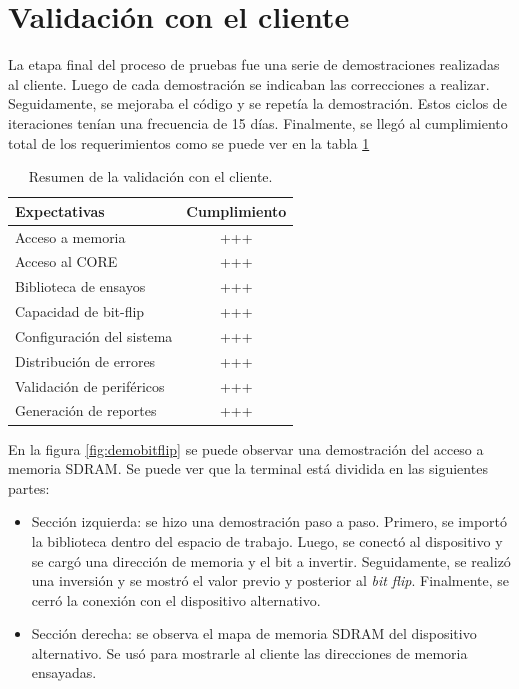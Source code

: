 \section{Validación con el cliente}
\label{sec:validacion}

La etapa final del proceso de pruebas fue una serie de demostraciones realizadas al cliente.
Luego de cada demostración se indicaban las correcciones a realizar.
Seguidamente, se mejoraba el código y se repetía la demostración.
Estos ciclos de iteraciones tenían una frecuencia de 15 días.
Finalmente, se llegó al cumplimiento total de los requerimientos como se puede ver en la tabla \ref{tab:validacion}

\begin{table}[h]
	\centering
	\caption[Resumen de la validación con el cliente]{Resumen de la validación con el cliente.}

	\begin{tabular}{l c}    
		\toprule
        \textbf{Expectativas}     & \textbf{Cumplimiento} \\
		\midrule
		Acceso a memoria          & +++                   \\
		Acceso al CORE            & +++                   \\
		Biblioteca de ensayos     & +++                   \\		
		Capacidad de bit-flip     & +++                   \\
		Configuración del sistema & +++                   \\
		Distribución de errores   & +++                   \\
		Validación de periféricos & +++                   \\
        Generación de reportes    & +++                   \\
		\bottomrule
		\hline
	\end{tabular}
	\label{tab:validacion}
\end{table}

En la figura \ref{fig:demobitflip} se puede observar una demostración del acceso a memoria SDRAM.
Se puede ver que la terminal está dividida en las siguientes partes:

\begin{itemize}
    \item Sección izquierda: se hizo una demostración paso a paso.
        Primero, se importó la biblioteca dentro del espacio de trabajo.
        Luego, se conectó al dispositivo y se cargó una dirección de memoria y el bit a invertir.
        Seguidamente, se realizó una inversión y se mostró el valor previo y posterior al \emph{bit flip}.
        Finalmente, se cerró la conexión con el dispositivo alternativo.
    \item Sección derecha: se observa el mapa de memoria SDRAM del dispositivo alternativo.
        Se usó para mostrarle al cliente las direcciones de memoria ensayadas.
\end{itemize}

